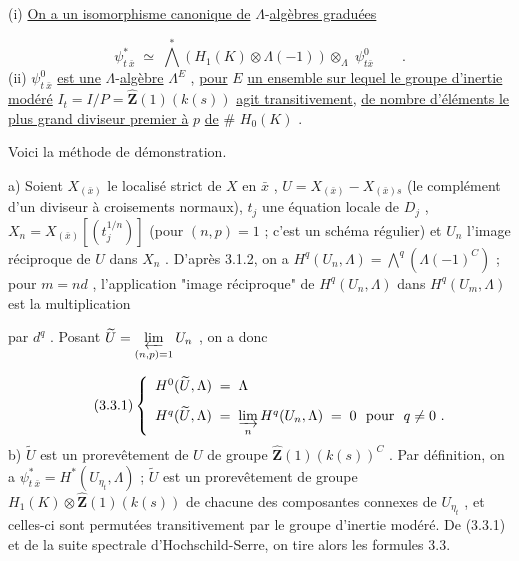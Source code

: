 (i) \underline{On a un isomorphisme canonique de} $\Lambda$-\underline{algèbres graduées}

\begin{equation*}
\psi^{*}_{t\ \bar{x}} \;\simeq\; \overset{*}{\bigwedge}(H_{1}(K) \otimes \Lambda(-1)) \otimes_{\Lambda} \; \psi^{0}_{t\bar{x}} \qquad .
\end{equation*}
(ii) $\psi^{0}_{t\ \bar{x}}$ \underline{est une} $\Lambda$-\underline{algèbre} $\Lambda^{E}$ , \underline{pour} $E$ \underline{un ensemble sur lequel le groupe d'inertie modéré} $I_{t} = I/P = \hat{\mathbf{Z}}(1)(k(s))$ \underline{agit transitivement}, \underline{de nombre d'éléments le plus grand diviseur premier à} $p$ \underline{de} $\#$ $H_{0}(K)$ .

Voici la méthode de démonstration.

a) Soient  $X_{(\bar{x})}$  le localisé strict de  $X$  en  $\bar{x}$ , $U = X_{(\bar{x})} - X_{(\bar{x})s}$  (le complément d'un diviseur à croisements normaux), $t_{j}$  une équation locale de  $D_{j}$ , $X_{n} = X_{(\bar{x})}\left[(t_{j}^{1/n})\right]$ (pour  $(n,p) = 1$ ; c'est un schéma régulier) et  $U_{n}$  l'image réciproque de  $U$  dans  $X_{n}$ . D'après 3.1.2, on a  $H^{q}(U_{n},\Lambda) = \overset{q}{\bigwedge}(\Lambda(-1)^{C})$  ; pour  $m = n d$ , l'application "image réciproque" de  $H^{q}(U_{n},\Lambda)$  dans  $H^{q}(U_{m},\Lambda)$  est la multiplication



par  $d^{q}$ . Posant  $\widetilde{U} = \varprojlim\limits_{(n,p)=1} U_{n}$ , on a donc

\begin{equation}\tag{3.3.1}
\left\{\begin{array}{l} H^{0}(\widetilde{U},\Lambda) \;=\; \Lambda \\[8pt] H^{q}(\widetilde{U},\Lambda) \;=\; \varinjlim\limits_{n} H^{q}(U_{n},\Lambda) \;=\; 0 \ \ \text{pour}\ \ q \neq 0 \ . \end{array}\right.
\end{equation}
b) $\widetilde{U}$  est un prorevêtement de  $U$  de groupe  $\hat{\mathbf{Z}}(1)(k(s))^{C}$ . Par définition, on a  $\psi^{*}_{t\ \bar{x}} = H^{*}(U_{\eta_{t}} ,\Lambda)$ ; $\widetilde{U}$  est un prorevêtement de groupe  $H_{1}(K) \otimes \hat{\mathbf{Z}}(1)(k(s))$  de chacune des composantes connexes de  $U_{\eta_{t}}$ , et celles-ci sont permutées transitivement par le groupe d'inertie modéré. De (3.3.1) et de la suite spectrale d'Hochschild-Serre, on tire alors les formules 3.3.

